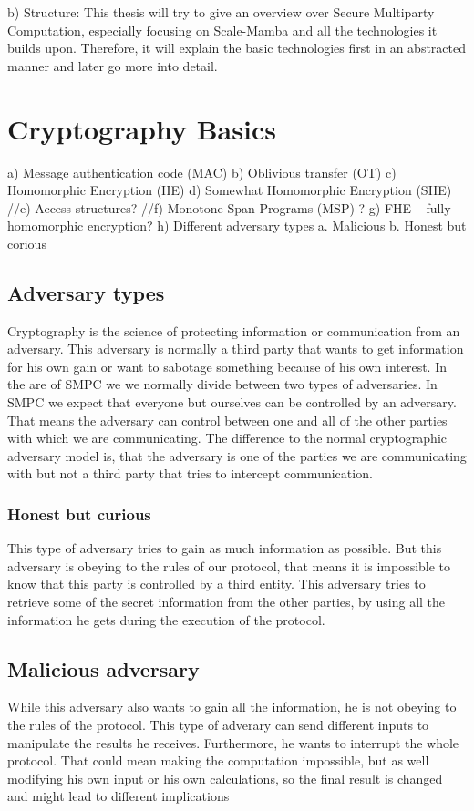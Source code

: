 \documentclass[english,runningheads,a4paper]{llncs}[2018/03/10]
\begin{document}
b)	Structure:
This thesis will try to give an overview over Secure Multiparty Computation, especially focusing on Scale-Mamba and all the technologies it builds upon. Therefore, it will explain the basic technologies first in an abstracted manner and later go more into detail. 




\section{Cryptography Basics}\label{sec:basics}
a)	Message authentication code (MAC)
b)	Oblivious transfer (OT)
c)	Homomorphic Encryption (HE)
d)	Somewhat Homomorphic Encryption (SHE)
//e)	Access structures?
//f)	Monotone Span Programs (MSP) ?
g)	FHE – fully homomorphic encryption?
h)	Different adversary types
a.	Malicious
b.	Honest but corious

\subsection{Adversary types}
Cryptography is the science of protecting information or communication from an adversary. This adversary is normally a third party that wants to get information for his own gain or want to sabotage something because of his own interest. In the are of SMPC we we normally divide between two types of adversaries. In SMPC we expect that everyone but ourselves can be controlled by an adversary.  That means the adversary can control between one and all of the other parties with which we are communicating. The difference to the normal cryptographic adversary model is, that the adversary is one of the parties we are communicating with but not a third party that tries to intercept communication.
\subsubsection{Honest but curious}
This type of adversary tries to gain as much information as possible. But this adversary is obeying to the rules of our protocol, that means it is impossible to know that this party is controlled by a third entity. This adversary tries to retrieve some of the secret information from the other parties, by using all the information he gets during the execution of the protocol.

\subsection{Malicious adversary}
While this adversary also wants to gain all the information, he is not obeying to the rules of the protocol. This type of adverary can send different inputs to manipulate the results he receives. Furthermore, he wants to interrupt the whole protocol. That could mean making the computation impossible, but as well modifying his own input or his own calculations, so the final result is changed and might lead to different implications
\end{document}
